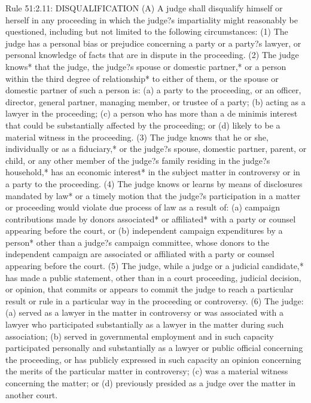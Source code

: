 \documentclass[12pt,\documentclassflag]{complaint}
\begin{document}
\begin{enumerate}
Rule 51:2.11: DISQUALIFICATION
(A) A judge shall disqualify himself or herself in any proceeding in which the judge?s impartiality might reasonably be questioned, including but not limited to the following circumstances:
(1) The judge has a personal bias or prejudice concerning a party or a party?s lawyer, or personal knowledge of facts that are in dispute in the proceeding.
(2) The judge knows* that the judge, the judge?s spouse or domestic partner,* or a person within the third degree of relationship* to either of them, or the spouse or domestic partner of such a person is:
(a) a party to the proceeding, or an officer, director, general partner, managing member, or trustee of a party;
(b) acting as a lawyer in the proceeding;
(c) a person who has more than a de minimis interest that could be substantially affected by the proceeding; or
(d) likely to be a material witness in the proceeding.
(3) The judge knows that he or she, individually or as a fiduciary,* or the judge?s spouse, domestic partner, parent, or child, or any other member of the judge?s family residing in the judge?s household,* has an economic interest* in the subject matter in controversy or in a party to the proceeding.
(4) The judge knows or learns by means of disclosures mandated by law* or a timely motion that the judge?s participation in a matter or proceeding would violate due process of law as a result of:
(a) campaign contributions made by donors associated* or affiliated* with a party or counsel appearing before the court, or
(b) independent campaign expenditures by a person* other than a judge?s campaign committee, whose donors to the independent campaign are associated or affiliated with a party or counsel appearing before the court.
(5) The judge, while a judge or a judicial candidate,* has made a public statement, other than in a court proceeding, judicial decision, or opinion, that commits or appears to commit the judge to reach a particular result or rule in a particular way in the proceeding or controversy.
(6) The judge:
(a) served as a lawyer in the matter in controversy or was associated with a lawyer who participated substantially as a lawyer in the matter during such association;
(b) served in governmental employment and in such capacity participated personally and substantially as a lawyer or public official concerning the proceeding, or has publicly expressed in such capacity an opinion concerning the merits of the particular matter in controversy;
(c) was a material witness concerning the matter; or
(d) previously presided as a judge over the matter in another court.

\end{enumerate}
\end{document}
